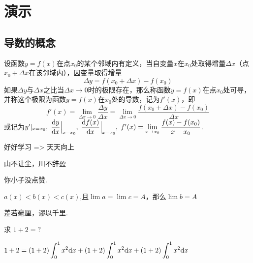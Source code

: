 \documentclass[12pt, a4paper, oneside, UTF8]{ctexbook}
\begin{document}
% 
\else
\fi

\chapter{演示}
\section{导数的概念}

\begin{defn}
    设函数$y=f(x)$在点$x_0$的某个邻域内有定义，当自变量$x$在$x_0$处取得增量$\Delta{x}$（点$x_0+\Delta{x}$在该邻域内），因变量取得增量
    \[ \Delta{y}=f(x_0+\Delta{x})-f(x_0) \]
    如果$\Delta{y}$与$\Delta{x}$之比当$\Delta{x}\to 0$时的极限存在，那么称函数$y=f(x)$在点$x_0$处可导，并称这个极限为函数$y=f(x)$在$x_0$处的导数，记为$f'(x)$，即
    \[
        f'(x) = \lim_{\Delta{x}\to0}\frac{\Delta{y}}{\Delta{x}} = \lim_{\Delta{x}\to 0}\frac{f(x_0+\Delta{x})-f(x_0)}{\Delta{x}}
    \]
    或记为$y'|_{x=x_0},\;\dfrac{\textup{d} y}{\textup{d} x}\Big|_{x = x_0},\;\dfrac{\textup{d} f(x)}{\textup{d} x}\Big|_{x=x_0},\;f'(x) = \lim\limits_{x\to x_0}\dfrac{f(x)-f(x_0)}{x-x_0}$.
\end{defn}

\begin{lemma}[瞎编的引理]
    好好学习 => 天天向上
\end{lemma}

\begin{thm}[瞎编的定理]
    山不让尘，川不辞盈
\end{thm}

\begin{corollary}[瞎编的推论]
    你小子没点赞.
\end{corollary}

\begin{criterion}[夹逼准则]
    $a(x) < b(x) < c(x)$,且$\lim{a} = \lim{c} = A$，那么$\lim{b} = A$
\end{criterion}

\begin{proposition}
    差若毫厘，谬以千里.
\end{proposition}

\begin{example}
    求 $ 1+2 = ?$
\end{example}

\begin{solution}
    $\displaystyle 1 + 2 = (1+2)\int_0^1 x^2 \textup{d} x + (1+2)\int_0^1 x^2 \textup{d} x + (1+2)\int_0^1 x^2 \textup{d} x$
\end{solution}
\end{document}
